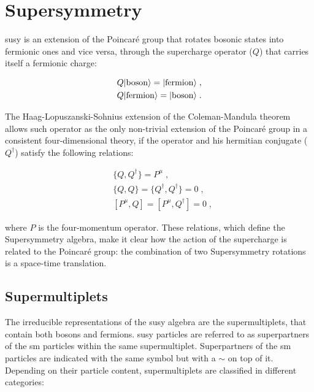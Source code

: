 \section{Supersymmetry}
\label{sec:smsusy:susy}

\gls{susy} \cite{Wess:1974tw, Salam:1974ig} is an extension of the Poincar\'e group that rotates bosonic states into fermionic ones and vice versa, through the supercharge operator ($Q$) that carries itself a fermionic charge: 

\begin{equation}
\begin{aligned}
&Q |{\rm boson}\rangle = |{\rm fermion }\rangle \;, \\
&Q |{\rm fermion}\rangle = |{\rm boson }\rangle \; .
\end{aligned}
\end{equation}

\noindent The Haag-Lopuszanski-Sohnius extension of the Coleman-Mandula theorem \cite{HAAG1975257} allows such operator as the only non-trivial extension of the Poincar\'e group in a consistent four-dimensional theory, if the operator and his hermitian conjugate ($Q^\dagger$) satisfy the following relations:

\begin{equation}
\begin{aligned}
&\{ Q, Q^\dagger \} = P^\mu \; ,  \\
&\{ Q,Q \} = \{ Q^\dagger , Q^\dagger \} = 0  \;,  \\
&[ P^\mu , Q  ] = [P^\mu, Q^\dagger ] = 0 \; ,
\label{eq:susyalgth}
\end{aligned}
\end{equation}

\noindent where $P$ is the four-momentum operator. These relations, which define the Supersymmetry algebra, make it clear how the action of the supercharge is related to the Poincar\'e group: the combination of two Supersymmetry rotations is a space-time translation.

\subsection{Supermultiplets}

The irreducible representations of the \gls{susy} algebra are the supermultiplets, that contain both bosons and fermions. 
\gls{susy} particles are referred to as superpartners of the \gls{sm} particles within the same supermultiplet.
Superpartners of the \gls{sm} particles are indicated with the same symbol but with a $\sim$ on top of it. Depending on their particle content, supermultiplets are classified in different categories:

